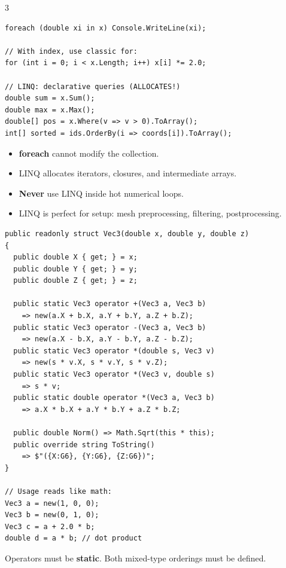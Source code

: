 \documentclass[9pt,a4paper]{extarticle}
\newenvironment{card}[3][acBlue]{%
  \begin{tcolorbox}[
    enhanced, colback=#2, colframe=bdCard,
    coltitle=black, colbacktitle=#2!70!bgHdr,
    fonttitle=\bfseries\fontsize{6.0pt}{7.2pt}\selectfont\MakeUppercase,
    title={#3},
    left=3pt, right=2pt, top=1.2pt, bottom=1.6pt,
    toptitle=1.0pt, bottomtitle=1.0pt,
    boxrule=0.4pt,
    borderline west={3pt}{0pt}{#1},
    arc=2pt, before skip=0pt, after skip=1.6mm,
    breakable,
  ]}{\end{tcolorbox}}
\newcommand{\code}[1]{{\ttfamily\bfseries #1}}
\begin{document}
\begin{multicols}{3}
\begin{card}[acRed]{bgRed}{\code{foreach}, LINQ, and When Not to Use Them}
\begin{lstlisting}[style=cs]
foreach (double xi in x) Console.WriteLine(xi);

// With index, use classic for:
for (int i = 0; i < x.Length; i++) x[i] *= 2.0;

// LINQ: declarative queries (ALLOCATES!)
double sum = x.Sum();
double max = x.Max();
double[] pos = x.Where(v => v > 0).ToArray();
int[] sorted = ids.OrderBy(i => coords[i]).ToArray();
\end{lstlisting}
\begin{itemize}
\item \code{foreach} cannot modify the collection.
\item LINQ allocates iterators, closures, and intermediate arrays.
\item \textbf{Never} use LINQ inside hot numerical loops.
\item LINQ is perfect for setup: mesh preprocessing, filtering, postprocessing.
\end{itemize}
\end{card}

\begin{card}[acNavy]{bgNavy}{Operator Overloading}
\begin{lstlisting}[style=cs]
public readonly struct Vec3(double x, double y, double z)
{
  public double X { get; } = x;
  public double Y { get; } = y;
  public double Z { get; } = z;

  public static Vec3 operator +(Vec3 a, Vec3 b)
    => new(a.X + b.X, a.Y + b.Y, a.Z + b.Z);
  public static Vec3 operator -(Vec3 a, Vec3 b)
    => new(a.X - b.X, a.Y - b.Y, a.Z - b.Z);
  public static Vec3 operator *(double s, Vec3 v)
    => new(s * v.X, s * v.Y, s * v.Z);
  public static Vec3 operator *(Vec3 v, double s)
    => s * v;
  public static double operator *(Vec3 a, Vec3 b)
    => a.X * b.X + a.Y * b.Y + a.Z * b.Z;

  public double Norm() => Math.Sqrt(this * this);
  public override string ToString()
    => $"({X:G6}, {Y:G6}, {Z:G6})";
}

// Usage reads like math:
Vec3 a = new(1, 0, 0);
Vec3 b = new(0, 1, 0);
Vec3 c = a + 2.0 * b;
double d = a * b; // dot product
\end{lstlisting}
Operators must be \code{static}. Both mixed-type orderings must be defined.
\end{card}


\end{multicols}
\end{document}
